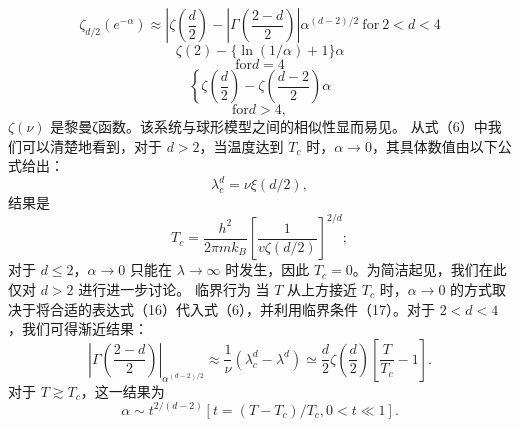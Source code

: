 \begin{equation}\tag{13.6.19}\label{eq:13.6.19}
\zeta_{d/2}(e^{-\alpha})\approx\left|\zeta\left(\frac{d}{2}\right)-\left|\Gamma\left(\frac{2-d}{2}\right)\right|\alpha^{(d-2)/2}\right.\mathrm{~for~}2<d<4
\end{equation}
\begin{equation}\tag{13.6.20}\label{eq:13.6.20}
\zeta \left( 2 \right) - \{ \ln ( 1 / \alpha ) + 1 \} \alpha
\end{equation}
\begin{equation}\tag{13.6.21}\label{eq:13.6.21}
\mathrm { f o r }  d = 4
\end{equation}
\begin{equation}\tag{13.6.22}\label{eq:13.6.22}
\left\{ \zeta \left( { \frac { d } { 2 } } \right) - \zeta \left( { \frac { d - 2 } { 2 } } \right) \alpha \right.
\end{equation}
\begin{equation}\tag{13.6.23}\label{eq:13.6.23}
\mathrm { f o r }  d > 4 ,
\end{equation}
\(\zeta(\nu)\) 是黎曼ζ函数。该系统与球形模型之间的相似性显而易见。
从式（6）中我们可以清楚地看到，对于 \(d > 2\)，当温度达到 \(T_c\) 时，\(\alpha \to 0\)，其具体数值由以下公式给出：
\begin{equation}\tag{13.6.24}\label{eq:13.6.24}
\lambda _ { c } ^{d} = \nu \xi ( d / 2 ) ,
\end{equation}
结果是
\begin{equation}\tag{13.6.25}\label{eq:13.6.25}
T _ { c } = \frac { h ^{2} } { 2 \pi m k _ { B } } \left[ \frac { 1 } { v \zeta ( d / 2 ) } \right] ^{2 / d} ;
\end{equation}
对于 \(d \leq 2\)，\(\alpha \to 0\) 只能在 \(\lambda \to \infty\) 时发生，因此 \(T_c = 0\)。为简洁起见，我们在此仅对 \(d > 2\) 进行进一步讨论。
临界行为
当 \(T\) 从上方接近 \(T_{c}\) 时，\(\alpha \to 0\) 的方式取决于将合适的表达式（16）代入式（6），并利用临界条件（17）。对于 \(2 < d < 4\)，我们可得渐近结果：
\begin{equation}\tag{13.6.26}\label{eq:13.6.26}
\left| \Gamma \left( \frac { 2 - d } { 2 } \right) \right| _ { \alpha ^{( d - 2 ) / 2} } \approx \frac { 1 } { \nu } ( \lambda _ { c } ^{d} - \lambda ^{d} ) \simeq \frac { d } { 2 } \zeta \left( \frac { d } { 2 } \right) \left[ \frac { T } { T _ { c } } - 1 \right] .
\end{equation}
对于 \(T \gtrsim T_{c}\)，这一结果为
\begin{equation}\tag{13.6.27}\label{eq:13.6.27}
\alpha \sim t ^{2 / ( d - 2 )}  [ t = ( T - T _ { c } ) / T _ { c } , 0 < t \ll 1 ] .
\end{equation}
